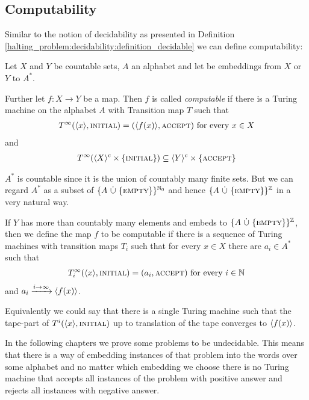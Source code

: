 \subsection{Computability}
\label{halting_problem:computability}

Similar to the notion of decidability as presented in Definition \ref{halting_problem:decidability:definition_decidable} we can define computability:

\begin{Definition}
	\label{halting_problem:computability:definition}
	Let $X$ and $Y$ be countable sets, $A$ an alphabet and let \emb{\cdot} be embeddings from $X$ or $Y$ to $A^*$.

	Further let $f:X \to Y$ be a map.
	Then $f$ is called \emph{computable} if there is a Turing machine on the alphabet $A$ with Transition map $T$ such that
	\begin{align*}
		T^\infty(\langle x \rangle,\text{\scshape{initial}}) = (\langle f(x) \rangle,\text{\scshape{accept}}) ~\text{for every}~ x \in X
	\end{align*}
	and
	\begin{align*}
		T^\infty(\langle X \rangle^c \times \{\text{\scshape{initial}}\}) \subseteq \langle Y \rangle^c \times \{\text{\scshape{accept}}\}
	\end{align*}
\end{Definition}

\begin{Remark}
	$A^*$ is countable since it is the union of countably many finite sets.
	But we can regard $A^*$ as a subset of $\{A ~\dot\cup~ \{\text{\scshape{empty}}\}\}^{\mathbb{N}_0}$ and hence $\{A ~\dot\cup~ \{\text{\scshape{empty}}\}\}^{\mathbb{Z}}$ in a very natural way.

	If $Y$ has more than countably many elements and embeds to $\{A ~\dot\cup~ \{\text{\scshape{empty}}\}\}^{\mathbb{Z}}$, then we define the map $f$ to be computable if there is a sequence of Turing machines with transition maps $T_i$ such that for every $x \in X$ there are $a_i \in A^*$ such that
	\begin{align*}
		T_i^\infty(\langle x \rangle, \text{\scshape{initial}}) = (a_i,\text{\scshape{accept}}) ~\text{for every}~ i \in \mathbb{N}
	\end{align*}
	and $a_i \xrightarrow{i \to \infty} \langle f(x) \rangle$.

	Equivalently we could say that there is a single Turing machine such that the tape-part of $T^i(\langle x \rangle,\text{\scshape{initial}})$ up to translation of the tape converges to $\langle f(x) \rangle$.
\end{Remark}

In the following chapters we prove some problems to be undecidable.
This means that there is a way of embedding instances of that problem into the words over some alphabet and no matter which embedding we choose there is no Turing machine that accepts all instances of the problem with positive answer and rejects all instances with negative answer.

